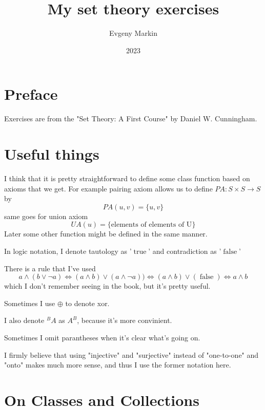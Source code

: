 \documentclass[11pt,oneside,titlepage]{book}
\title{My set theory exercises}
\author{Evgeny Markin}
\date{2023}
\DeclareMathOperator \lra {\Leftrightarrow}
\DeclareMathOperator \true {true}
\DeclareMathOperator \false {false}
\begin{document}
\maketitle
\tableofcontents

\chapter*{Preface}

Exercises are from the "Set Theory: A First Course" by Daniel W. Cunningham.

\chapter*{Useful things}

I think that it is pretty straightforward to define some class function based on
axioms that we get.
For example pairing axiom allows us to define $PA: S \times S \to S$ by
$$PA(u, v) = \{u, v\}$$
same goes for union axiom
$$UA(u) = \{\text{elements of elements of U}\}$$
Later some other function might be defined in the same manner.

In logic notation, I denote tautology as '$\true$' and contradiction as '$\false$'

There is a rule that I've used
$$a \land (b \lor \neg a) \lra (a \land b) \lor (a \land \neg a))
\lra (a \land b) \lor (\false) \lra a \land b$$
which I don't remember seeing in the book, but it's pretty useful.

Sometimes I use $\oplus$ to denote xor.

I also denote $^BA$ as $A^B$, because it's more convinient.

Sometimes I omit parantheses when it's clear what's going on.

I firmly believe that using "injective" and "surjective" instead of "one-to-one" and
"onto" makes much more sense, and thus I use the former notation here.

\chapter*{On Classes and Collections}
\end{document}
